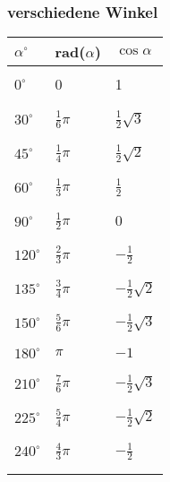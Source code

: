 \documentclass[6pt,a4paper]{scrartcl}
\begin{document}
\begin{multicols*}{3}
\subsubsection{verschiedene Winkel}
\begin{tabular}{lll}
$\alpha^\circ$&rad($\alpha$)&$\cos{\alpha}$\\
\hline
\\
$0^\circ$ & 0 & 1 \\
\\
\hline
\\
$30^\circ$  & $\frac{1}{6}\pi$  & $\frac{1}{2}\sqrt{3}$ \\
\\
\hline
\\
$45^\circ$  & $\frac{1}{4}\pi$  & $\frac{1}{2}\sqrt{2}$ \\
\\
\hline
\\
$60^\circ$  & $\frac{1}{3}\pi$  & $\frac{1}{2}$ \\
\\
\hline
\\
$90^\circ$  & $\frac{1}{2}\pi$  & $0$ \\
\\
\hline
\\
$120^\circ$ & $\frac{2}{3}\pi$  & $-\frac{1}{2}$ \\
\\
\hline
\\
$135^\circ$ & $\frac{3}{4}\pi$  & $-\frac{1}{2}\sqrt{2}$ \\
\\
\hline
\\
$150^\circ$ & $\frac{5}{6}\pi$  & $-\frac{1}{2}\sqrt{3}$ \\
\\
\hline
\\
$180^\circ$ & $\pi$             & $-1$ \\
\\
\hline
\\
$210^\circ$ & $\frac{7}{6}\pi$  & $-\frac{1}{2}\sqrt{3}$ \\
\\
\hline
\\
$225^\circ$ & $\frac{5}{4}\pi$  & $-\frac{1}{2}\sqrt{2}$ \\
\\
\hline
\\
$240^\circ$ & $\frac{4}{3}\pi$  & $-\frac{1}{2}$ \\
\\
\hline
\\

\end{tabular}
\end{multicols*}
\end{document}
